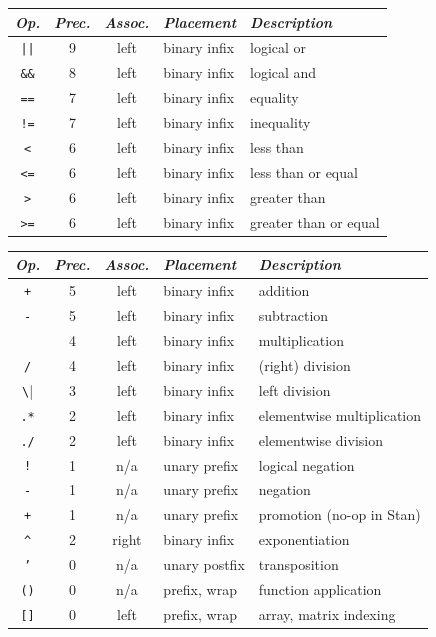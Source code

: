 \documentclass[10pt]{report}
\newcommand{\sld}[1]{\newpage{\noindent\LARGE \ \ \
    \textcolor{MidnightBlue}{\bfseries #1}}\vspace*{4pt}}
\newcommand{\code}[1]{{\tt #1}}
\newcommand{\spc}{\hspace*{0.25in}}
\begin{document}
\sld{Logical Operators}
\vfill
\noindent\spc
{\footnotesize
  \begin{tabular}{c|ccl|l}
    {\it Op.} & {\it Prec.} & {\it Assoc.} & {\it
      Placement} & {\it Description}
    \\ \hline \hline
    \code{||} & 9 & left & binary infix & logical or
    \\ \hline
    \Verb|&&| & 8 & left & binary infix & logical and
    \\ \hline
    \Verb|==| & 7 & left & binary infix & equality
    \\
    \Verb|!=| & 7 & left & binary infix & inequality
    \\ \hline
    \Verb|<| & 6 & left & binary infix & less than
    \\
    \Verb|<=| & 6 & left & binary infix & less than or equal
    \\
    \Verb|>| & 6 & left & binary infix & greater than 
    \\
    \Verb|>=| & 6 & left & binary infix & greater than or equal
  \end{tabular}
}
\vfill
\vfill

\sld{Arithmetic and Matrix Operators}
\vfill
\noindent\spc
{\footnotesize
  \begin{tabular}{c|ccl|l}
    {\it Op.} & {\it Prec.} & {\it Assoc.} & {\it
      Placement} & {\it Description}
    \\ \hline \hline

    \code{+} & 5 & left & binary infix & addition
    \\
    \code{-} & 5 & left & binary infix & subtraction
    \\ \hline
    \code{*} & 4 & left & binary infix & multiplication
    \\
    \code{/} & 4 & left & binary infix & (right) division
    \\ \hline
    \Verb|\| & 3 & left & binary infix & left division
    \\ \hline
    \code{.*} & 2 & left & binary infix & elementwise multiplication
    \\
    \code{./} & 2 & left & binary infix & elementwise division
    \\ \hline
    \code{!} & 1 & n/a & unary prefix & logical negation
    \\
    \code{-} & 1 & n/a & unary prefix & negation
    \\ 
    \code{+} & 1 & n/a & unary prefix & promotion (no-op in Stan)
    \\ \hline
    \Verb|^| & 2 & right & binary infix & exponentiation
    \\ \hline
    \code{'} & 0 & n/a & unary postfix & transposition
    \\ \hline \hline
    \code{()} & 0 & n/a & prefix, wrap & function application
    \\
    \code{[]} & 0 & left & prefix, wrap & array, matrix indexing
  \end{tabular}
}
\vfill
\end{document}
